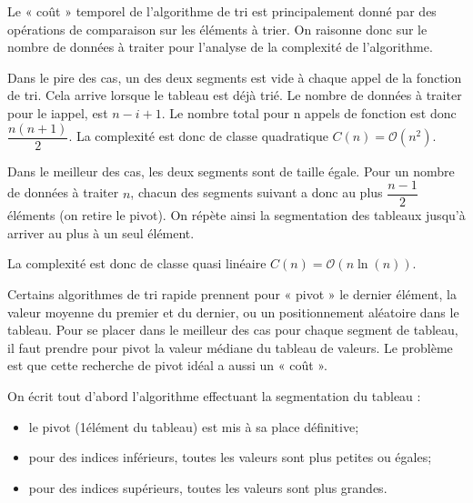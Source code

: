 \documentclass[10pt,fleqn]{article} %
\begin{document}
Le « coût » temporel de l'algorithme de tri est principalement donné par des opérations de comparaison sur les éléments à trier. On raisonne donc sur le nombre de données à traiter pour l'analyse de la complexité de l'algorithme.

Dans le pire des cas, un des deux segments est vide à chaque appel de la fonction de tri. Cela arrive lorsque le tableau est déjà trié. Le nombre de données à traiter  pour le i\ieme appel, est $n - i + 1$.
Le nombre total pour n appels de fonction est donc $\dfrac{n(n+1)}{2}$. %
La complexité est donc de classe quadratique $C(n) = \mathcal{O}\left(n^2\right)$.

Dans le meilleur des cas, les deux segments sont de taille égale. Pour un nombre de données à traiter $n$, chacun des segments suivant a donc au plus $\dfrac{n-1}{2}$ éléments (on retire le pivot). On répète ainsi la segmentation des tableaux jusqu'à arriver au plus à un seul élément. 
 
La complexité est donc de classe quasi linéaire $C(n)=\mathcal{O}\left(n \ln(n)\right)$.

\begin{rem}
Certains algorithmes de tri rapide prennent pour « pivot » le dernier élément, la valeur moyenne du premier et du dernier, ou un positionnement aléatoire dans le tableau. Pour se placer dans le meilleur des cas pour chaque segment de tableau, il faut prendre pour pivot la valeur médiane du tableau de valeurs. Le problème est que cette recherche de pivot idéal a aussi un « coût ».
\end{rem}

On écrit tout d'abord l'algorithme effectuant la segmentation du tableau :
\begin{itemize}
\item le pivot (1\ier élément du tableau) est mis à sa place définitive;
\item pour des indices inférieurs, toutes les valeurs sont plus petites ou égales;
\item pour des indices supérieurs, toutes les valeurs sont plus grandes.
\end{itemize}
\end{document}
